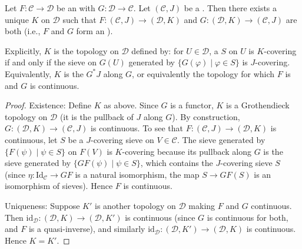 \begin{proposition} \label{proposition:unique_site_structure_induced_by_equivalence_of_categories}
Let $F: \mathcal{C} \to \mathcal{D}$ be an  with  $G: \mathcal{D} \to \mathcal{C}$. Let $(\mathcal{C}, J)$ be a . Then there exists a unique  $K$ on $\mathcal{D}$ such that $F: (\mathcal{C}, J) \to (\mathcal{D}, K)$ and $G: (\mathcal{D}, K) \to (\mathcal{C}, J)$ are both  (i.e., $F$ and $G$ form an ).

Explicitly, $K$ is the topology on $\mathcal{D}$ defined by: for $U \in \mathcal{D}$, a  $S$ on $U$ is $K$-covering if and only if the sieve on $G(U)$ generated by $\{G(\varphi) \mid \varphi \in S\}$ is $J$-covering. Equivalently, $K$ is the  $G^*J$ along $G$, or equivalently the topology for which $F$ is  and $G$ is continuous.

\begin{proof}
Existence: Define $K$ as above. Since $G$ is a functor, $K$ is a Grothendieck topology on $\mathcal{D}$ (it is the pullback of $J$ along $G$). By construction, $G: (\mathcal{D}, K) \to (\mathcal{C}, J)$ is continuous. To see that $F: (\mathcal{C}, J) \to (\mathcal{D}, K)$ is continuous, let $S$ be a $J$-covering sieve on $V \in \mathcal{C}$. The sieve generated by $\{F(\psi) \mid \psi \in S\}$ on $F(V)$ is $K$-covering because its pullback along $G$ is the sieve generated by $\{GF(\psi) \mid \psi \in S\}$, which contains the $J$-covering sieve $S$ (since $\eta: \mathrm{Id}_{\mathcal{C}} \to GF$ is a natural isomorphism, the map $S \to GF(S)$ is an isomorphism of sieves). Hence $F$ is continuous.

Uniqueness: Suppose $K'$ is another topology on $\mathcal{D}$ making $F$ and $G$ continuous. Then $\mathrm{id}_{\mathcal{D}}: (\mathcal{D}, K) \to (\mathcal{D}, K')$ is continuous (since $G$ is continuous for both, and $F$ is a quasi-inverse), and similarly $\mathrm{id}_{\mathcal{D}}: (\mathcal{D}, K') \to (\mathcal{D}, K)$ is continuous. Hence $K = K'$.
\end{proof}
\end{proposition}